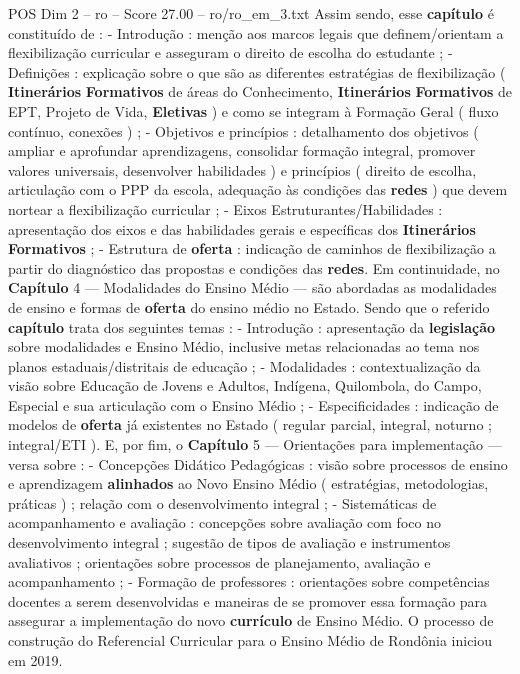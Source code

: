 \begin{textsample}{POS Dim 2 – ro – Score 27.00 – ro/ro\_em\_3.txt}
Assim sendo, esse \textbf{capítulo} é constituído de : - Introdução : menção aos marcos legais que definem/orientam a flexibilização curricular e asseguram o direito de escolha do estudante ; - Definições : explicação sobre o que são as diferentes estratégias de flexibilização ( \textbf{Itinerários} \textbf{Formativos} de áreas do Conhecimento, \textbf{Itinerários} \textbf{Formativos} de EPT, Projeto de Vida, \textbf{Eletivas} ) e como se integram à Formação Geral ( fluxo contínuo, conexões ) ; - Objetivos e princípios : detalhamento dos objetivos ( ampliar e aprofundar aprendizagens, consolidar formação integral, promover valores universais, desenvolver habilidades ) e princípios ( direito de escolha, articulação com o PPP da escola, adequação às condições das \textbf{redes} ) que devem nortear a flexibilização curricular ; - Eixos Estruturantes/Habilidades : apresentação dos eixos e das habilidades gerais e específicas dos \textbf{Itinerários} \textbf{Formativos} ; - Estrutura de \textbf{oferta} : indicação de caminhos de flexibilização a partir do diagnóstico das propostas e condições das \textbf{redes}.
Em continuidade, no \textbf{Capítulo} 4 — Modalidades do Ensino Médio — são abordadas as modalidades de ensino e formas de \textbf{oferta} do ensino médio no Estado.
Sendo que o referido \textbf{capítulo} trata dos seguintes temas : - Introdução : apresentação da \textbf{legislação} sobre modalidades e Ensino Médio, inclusive metas relacionadas ao tema nos planos estaduais/distritais de educação ; - Modalidades : contextualização da visão sobre Educação de Jovens e Adultos, Indígena, Quilombola, do Campo, Especial e sua articulação com o Ensino Médio ; - Especificidades : indicação de modelos de \textbf{oferta} já existentes no Estado ( regular parcial, integral, noturno ; integral/ETI ).
E, por fim, o \textbf{Capítulo} 5 — Orientações para implementação — versa sobre : - Concepções Didático Pedagógicas : visão sobre processos de ensino e aprendizagem \textbf{alinhados} ao Novo Ensino Médio ( estratégias, metodologias, práticas ) ; relação com o desenvolvimento integral ; - Sistemáticas de acompanhamento e avaliação : concepções sobre avaliação com foco no desenvolvimento integral ; sugestão de tipos de avaliação e instrumentos avaliativos ; orientações sobre processos de planejamento, avaliação e acompanhamento ; - Formação de professores : orientações sobre competências docentes a serem desenvolvidas e maneiras de se promover essa formação para assegurar a implementação do novo \textbf{currículo} de Ensino Médio.
O processo de construção do Referencial Curricular para o Ensino Médio de Rondônia iniciou em 2019.

\end{textsample}
